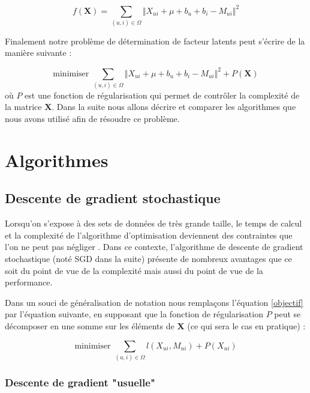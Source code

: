 \documentclass[10pt,a4paper]{article}
\begin{document}
$$ f(\textbf{X}) = \sum_{(u,i)\in\Omega}\Vert X_{ui}+\mu + b_u  + b_i-M_{ui} \Vert^2 $$

Finalement notre problème de détermination de facteur latents peut s'écrire de la manière suivante :

\begin{equation}
\label{objectif}
 \text{minimiser } \sum_{(u,i)\in\Omega}\Vert X_{ui}+\mu + b_u  + b_i-M_{ui} \Vert^2 + P(\textbf{X})
\end{equation}
où $P$ est une fonction de régularisation qui permet de contrôler la complexité de la matrice $\textbf{X}$. Dans la suite nous allons décrire et comparer les algorithmes que nous avons utilisé afin de résoudre ce problème.

\section{Algorithmes}

\subsection{Descente de gradient stochastique}


Lorsqu'on s'expose à des sets de données de très grande taille, le temps de calcul et la complexité de l'algorithme d'optimisation deviennent des contraintes que l'on ne peut pas négliger \cite{bottouSGD} \cite{bottou}. Dans ce contexte, l'algorithme de descente de gradient stochastique (noté SGD dans la suite) présente de nombreux avantages que ce soit du point de vue de la complexité mais aussi du point de vue de la performance.

Dans un souci de généralisation de notation nous remplaçons l'équation \eqref{objectif} par l'équation suivante, en supposant que la fonction de régularisation $P$ peut se décomposer en une somme sur les éléments de \textbf{X} (ce qui sera le cas en pratique) :

\begin{equation}
\label{objectif2}
 \text{minimiser } \sum_{(u,i)\in\Omega}l(X_{ui},M_{ui}) + P(X_{ui})
\end{equation}

\subsubsection*{Descente de gradient "usuelle"}
\end{document}
